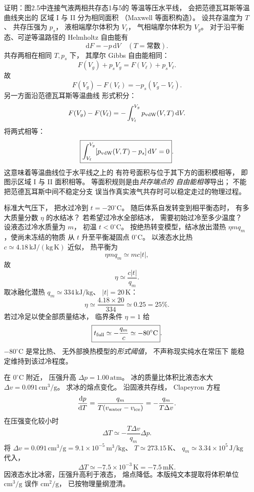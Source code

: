 证明：图2.5中连接气液两相共存态1与5的
等温等压水平线，
会把范德瓦耳斯等温曲线夹出的
区域 I 与 II 分为相同面积
（Maxwell 等面积构造）。
\exsolution
设共存温度为 $T$、
共存压强为 $p_s$，
液相端摩尔体积为 $V_\ell$，
气相端摩尔体积为 $V_g$。
对于沿平衡态、可逆等温路径的
Helmholtz 自由能有
\[
\mathrm dF=-p\,\mathrm dV
\quad(T=\text{常数}).
\]
共存两相在相同 $T,p_s$ 下，
其摩尔 Gibbs 自由能相同：
\[
F(V_g)+p_sV_g=F(V_\ell)+p_sV_\ell.
\]
故
\[
F(V_g)-F(V_\ell)
=-p_s(V_g-V_\ell).
\]
另一方面沿范德瓦耳斯等温曲线
形式积分：
\[
F(V_g)-F(V_\ell)
=-\int_{V_\ell}^{V_g}p_{\rm vdW}(V,T)\,\mathrm dV.
\]
将两式相等：
\[
\boxed{\int_{V_\ell}^{V_g}
[p_{\rm vdW}(V,T)-p_s]\,\mathrm dV=0}.
\]
这意味着等温曲线位于水平线之上的
有符号面积与位于其下方的面积模相等，
即图示区域 I 与 II 面积相等。
\excheck 等面积规则是由\emph{共存端点的
自由能相等}导出；
不能把范德瓦耳斯中间不稳定分支
误当作真实液气共存时可以稳定走过的物理过程。

标准大气压下，
把水过冷到 $t=-20^\circ\mathrm C$。
随后体系自发转变到相平衡态时，
有多大质量分数 $\eta$ 的水结冰？
若希望过冷水全部结冰，
需要初始过冷至多少温度？
\exsolution
设液态过冷水质量为 $m$，
初温 $t<0^\circ\mathrm C$。
按绝热转变模型，结冰放出潜热
$\eta m q_m$，使尚未冻结的物质
从 $t$ 升至平衡凝固点 $0^\circ\mathrm C$。
以液态水比热 $c\simeq4.18\,\mathrm{kJ/(kg\,K)}$
近似，
热平衡为
\[
\eta m q_m\simeq mc|t|,
\]
故
\[
\boxed{\eta\simeq\frac{c|t|}{q_m}}.
\]
取冰融化潜热
$q_m\simeq334\,\mathrm{kJ/kg}$、
$|t|=20\,\mathrm K$：
\[
\boxed{\eta\simeq\frac{4.18\times20}{334}
\simeq0.25=25\%}.
\]
若过冷足以使全部质量结冰，
临界条件 $\eta=1$ 给
\[
\boxed{t_{\rm full}\simeq-\frac{q_m}{c}
\simeq-80^\circ\mathrm C}.
\]
\excheck $-80^\circ\mathrm C$ 是常比热、
无外部换热模型的\emph{形式阈值}，
不声称现实纯水在常压下
能稳定维持到该过冷程度。

在 $0^\circ\mathrm C$ 附近，
压强升高 $\Delta p=1.00\,\mathrm{atm}$。
冰的质量比体积比液态水大
$\Delta v=0.091\,\mathrm{cm^3/g}$。
求冰的熔点变化。
\exsolution
沿固液共存线，
Clapeyron 方程
\[
\frac{\mathrm dp}{\mathrm dT}
=\frac{q_m}{T(v_{\rm water}-v_{\rm ice})}
=-\frac{q_m}{T\Delta v}.
\]
在压强变化较小时
\[
\boxed{\Delta T\simeq
-\frac{T\Delta v}{q_m}\Delta p}.
\]
将 $\Delta v=0.091\,\mathrm{cm^3/g}
=9.1\times10^{-5}\,\mathrm{m^3/kg}$、
$T\simeq273.15\,\mathrm K$、
$q_m\simeq3.34\times10^5\,\mathrm{J/kg}$ 代入，
\[
\boxed{\Delta T\simeq-7.5\times10^{-3}\,\mathrm K
=-7.5\,\mathrm{mK}}.
\]
\excheck 因液态水比冰密，压强升高利于液态，
熔点降低。本版纯文本提取将体积单位
$\mathrm{cm^3/g}$ 误作 $\mathrm{cm^2/g}$，
已按物理量纲澄清。

